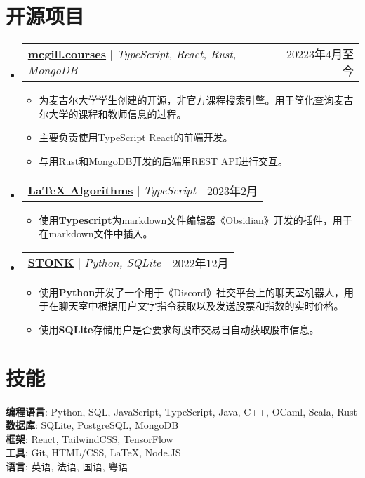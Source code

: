 \documentclass[letterpaper,11pt]{article}
\makeatletter
\newcommand{\resumeItem}[1]{
  \item\small{
    {#1 \vspace{-2pt}}
  }
}
\newcommand{\resumeProjectHeading}[2]{
  \item
  \begin{tabular*}{0.97\textwidth}{l@{\extracolsep{\fill}}r}
    \small#1 & #2 \\
  \end{tabular*}\vspace{-7pt}
}
\newcommand{\resumeSubHeadingListStart}{\begin{itemize}[leftmargin=0.15in, label={}]}
\newcommand{\resumeSubHeadingListEnd}{\end{itemize}}
\newcommand{\resumeItemListStart}{\begin{itemize}}
\newcommand{\resumeItemListEnd}{\end{itemize}\vspace{-5pt}}
\makeatother
\begin{document}
\begin{CJK*}{UTF8}{gbsn}
  \section{开源项目}
  \resumeSubHeadingListStart
  \resumeProjectHeading
  {\href{https://github.com/SamZhang02/DrooVE}{\textbf{mcgill.courses}} $|$ \emph{TypeScript, React, Rust, MongoDB}}{20223年4月至今}
  \resumeItemListStart
  \resumeItem{为麦吉尔大学学生创建的开源，非官方课程搜索引擎。用于简化查询麦吉尔大学的课程和教师信息的过程。}
  \resumeItem{主要负责使用TypeScript React的前端开发。}
  \resumeItem{与用Rust和MongoDB开发的后端用REST API进行交互。}
  \resumeItemListEnd
  \resumeProjectHeading
  {\href{https://github.com/SamZhang02/obsidian-latex-algorithms}{\textbf{LaTeX Algorithms}} $|$ \emph{TypeScript}}{2023年2月}
  \resumeItemListStart
  \resumeItem{使用\textbf{Typescript}为markdown文件编辑器《Obsidian》开发的插件，用于在markdown文件中插入\LaTeX格式的数学证明与算法。}
  \resumeItemListEnd
  \resumeProjectHeading
  {\href{https://github.com/SamZhang02/STONK}{\textbf{STONK}} $|$ \emph{Python, SQLite}}{2022年12月}
  \resumeItemListStart
  \resumeItem{使用\textbf{Python}开发了一个用于《Discord》社交平台上的聊天室机器人，用于在聊天室中根据用户文字指令获取以及发送股票和指数的实时价格。}
  \resumeItem{使用\textbf{SQLite}存储用户是否要求每股市交易日自动获取股市信息。}
  \resumeItemListEnd
  \resumeSubHeadingListEnd

  \section{技能}
  \begin{itemize}[leftmargin=0.15in, label={}]
    \small{\item{
                  \textbf{编程语言}{: Python, SQL, JavaScript, TypeScript, Java, C++, OCaml, Scala, Rust} \\
                  \textbf{数据库}{: SQLite, PostgreSQL, MongoDB}\\
                  \textbf{框架}{: React, TailwindCSS, TensorFlow}\\
                  \textbf{工具}{: Git, HTML/CSS, \LaTeX, Node.JS}\\
                  \textbf{语言}{: 英语, 法语, 国语, 粤语}\\
            }}
  \end{itemize}


\end{CJK*}
\end{document}
